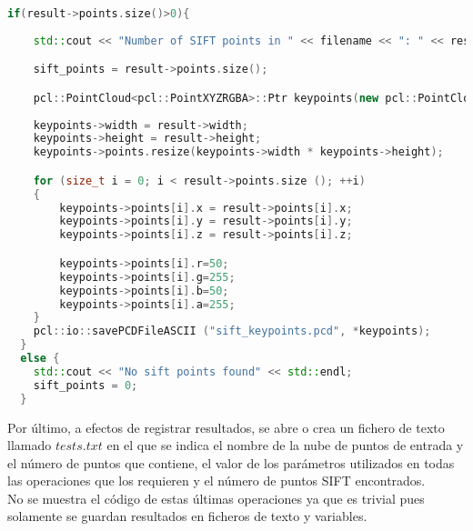 \begin{lstlisting}[language=C++,breaklines]
  if(result->points.size()>0){
  
  	std::cout << "Number of SIFT points in " << filename << ": " << result->points.size () << std::endl;

	sift_points = result->points.size();

	pcl::PointCloud<pcl::PointXYZRGBA>::Ptr keypoints(new pcl::PointCloud<pcl::PointXYZRGBA>);
  
	keypoints->width = result->width;
	keypoints->height = result->height;
	keypoints->points.resize(keypoints->width * keypoints->height);

   	for (size_t i = 0; i < result->points.size (); ++i)
  	{
    	keypoints->points[i].x = result->points[i].x;
    	keypoints->points[i].y = result->points[i].y;
    	keypoints->points[i].z = result->points[i].z;

  		keypoints->points[i].r=50;
  		keypoints->points[i].g=255;
  		keypoints->points[i].b=50;
  		keypoints->points[i].a=255;
  	}
  	pcl::io::savePCDFileASCII ("sift_keypoints.pcd", *keypoints);
  }
  else {
  	std::cout << "No sift points found" << std::endl;
	sift_points = 0;
  }
\end{lstlisting}
\fi
Por último, a efectos de registrar resultados, se abre o crea un fichero de texto llamado $tests.txt$ en el que se indica el nombre de la nube de puntos de entrada y el número de puntos que contiene, el valor de los parámetros utilizados en todas las operaciones que los requieren y el número de puntos SIFT encontrados.
\\
\iffalse
\begin{lstlisting}[language=C++,breaklines]
  std::fstream fs;
  fs.open("tests.txt", std::fstream::app);
  
  fs << "filename: " << filename << std::endl;
  
  fs << std::endl <<  "Normal estimation radius search: " << radius_search << std::endl; 
  fs << "Minimum scale: " << min_scale << std::endl;
  fs << "Number of octaves: " << n_octaves << std::endl;
  fs << "Number of scales per octave: " << n_scales_per_octave << std::endl;
  fs << "Minimum contrast: " << min_contrast << std::endl;

  fs << std::endl << "Normal estimation time (s): " << normal_estimation_time << std::endl;
  fs << "SIFT points estimation time (s): " << sift_estimation_time << std::endl;
  fs << "Number of SIFT points found: " << sift_points << std::endl;

  fs << "---------------------\n----------------------\n";
  fs.close();
  return 0;
}
\end{lstlisting}
\fi
No se muestra el código de estas últimas operaciones ya que es trivial pues solamente se guardan resultados en ficheros de texto y variables.


